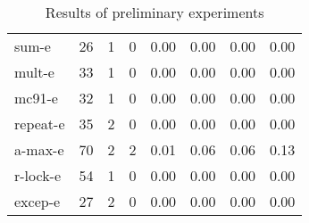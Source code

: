 \begin{table*}
\begin{center}
\begin{tabular}{|l|r|r|r|r|r|r|r|}
sum-e&          26&     1&      0 & 0.00 & 0.00 & 0.00 & 0.00 \\
mult-e&         33&     1&      0 & 0.00 & 0.00 & 0.00 & 0.00 \\
mc91-e&         32&     1&      0 & 0.00 & 0.00 & 0.00 & 0.00 \\
repeat-e&       35&     2&      0 & 0.00 & 0.00 & 0.00 & 0.00 \\
a-max-e&        70&     2&      2 & 0.01 & 0.06 & 0.06 & 0.13 \\
r-lock-e&         54&     1&      0 & 0.00 & 0.00 & 0.00 & 0.00 \\
excep-e&        27&     2&      0 & 0.00 & 0.00 & 0.00 & 0.00 \\
\hline

\end{tabular}
\end{center}
\caption{Results of preliminary experiments}
\label{tab:exp}
\end{table*}




